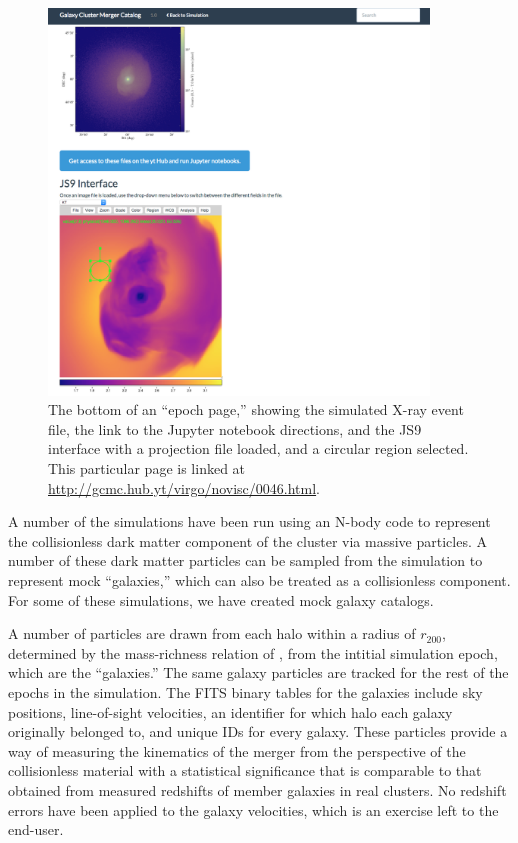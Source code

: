 \documentclass{emulateapj}
\begin{document}
\begin{figure}
\begin{center}
\includegraphics[width=0.9\textwidth]{epoch_page2.eps}
\caption{The bottom of an ``epoch page,'' showing the simulated X-ray event file, the link to the Jupyter notebook directions, and the JS9 interface with a projection file loaded, and a circular region selected. This particular page is linked at \url{http://gcmc.hub.yt/virgo/novisc/0046.html}.}
\end{center}
\end{figure}

A number of the simulations have been run using an N-body code to represent the collisionless dark matter component of the cluster via massive particles. A number of these dark matter particles can be sampled from the simulation to represent mock ``galaxies,'' which can also be treated as a collisionless component. For some of these simulations, we have created mock galaxy catalogs.

A number of particles are drawn from each halo within a radius of $r_{200}$, determined by the mass-richness relation of \citet{for14}, from the intitial simulation epoch, which are the ``galaxies.'' The same galaxy particles are tracked for the rest of the epochs in the simulation. The FITS binary tables for the galaxies include sky positions, line-of-sight velocities, an identifier for which halo each galaxy originally belonged to, and unique IDs for every galaxy. These particles provide a way of measuring the kinematics of the merger from the perspective of the collisionless material with a statistical significance that is comparable to that obtained from measured redshifts of member galaxies in real clusters. No redshift errors have been applied to the galaxy velocities, which is an exercise left to the end-user.
\end{document}
